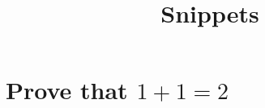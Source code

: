 \documentclass{article}
\title{Snippets}
\begin{document}
	\maketitle %
	\tableofcontents %
	\section{Prove that $1 + 1 = 2$}
\end{document}
